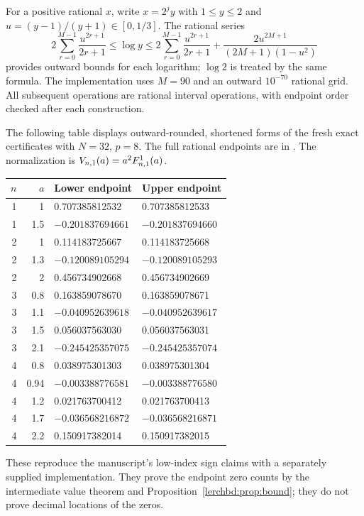 For a positive rational $x$, write $x=2^jy$ with $1\le y\le2$ and $u=(y-1)/(y+1)\in[0,1/3]$. The rational series
\[
 2\sum_{r=0}^{M-1}\frac{u^{2r+1}}{2r+1}
 \le\log y\le
 2\sum_{r=0}^{M-1}\frac{u^{2r+1}}{2r+1}
 +\frac{2u^{2M+1}}{(2M+1)(1-u^2)}
\]
provides outward bounds for each logarithm; $\log2$ is treated by the same formula. The implementation uses $M=90$ and an outward $10^{-70}$ rational grid. All subsequent operations are rational interval operations, with endpoint order checked after each construction.

The following table displays outward-rounded, shortened forms of the fresh exact certificates with $N=32$, $p=8$. The full rational endpoints are in . The normalization is $V_{n,1}(a)=a^2F_{n,1}^{1}(a)$.
\begin{center}\small
\begin{tabular}{@{}rrll@{}}
\toprule
$n$&$a$&Lower endpoint&Upper endpoint\\\midrule
1&1&0.707385812532&0.707385812533\\
1&1.5&$-0.201837694661$&$-0.201837694660$\\
2&1&0.114183725667&0.114183725668\\
2&1.3&$-0.120089105294$&$-0.120089105293$\\
2&2&0.456734902668&0.456734902669\\
3&0.8&0.163859078670&0.163859078671\\
3&1.1&$-0.040952639618$&$-0.040952639617$\\
3&1.5&0.056037563030&0.056037563031\\
3&2.1&$-0.245425357075$&$-0.245425357074$\\
4&0.8&0.038975301303&0.038975301304\\
4&0.94&$-0.003388776581$&$-0.003388776580$\\
4&1.2&0.021763700412&0.021763700413\\
4&1.7&$-0.036568216872$&$-0.036568216871$\\
4&2.2&0.150917382014&0.150917382015\\\bottomrule
\end{tabular}
\end{center}
These reproduce the manuscript's low-index sign claims with a separately supplied implementation. They prove the endpoint zero counts by the intermediate value theorem and Proposition~\ref{lerchbd:prop:bound}; they do not prove decimal locations of the zeros.

